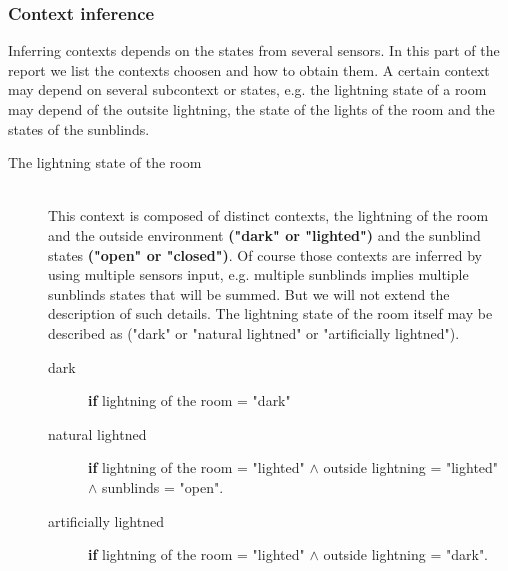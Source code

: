 \documentclass{acm_proc_article-sp}
\begin{document}
\subsubsection{Context inference}
Inferring contexts depends on the states from several sensors. In this part of the report we list the contexts choosen and how to obtain them.
A certain context may depend on several subcontext or states, 
e.g. the lightning state of a room may depend of the outsite lightning, the state of the lights of the room and the states of the sunblinds.
\begin{description}
 \item[The lightning state of the room]\hfill \\ 
 This context is composed of distinct contexts, the lightning of the room and the outside environment \textbf{("dark" or "lighted")} and the sunblind states \textbf{("open" or "closed")}. 
 Of course those contexts are inferred by using multiple sensors input, e.g. multiple sunblinds implies multiple sunblinds states that will be summed. But we will not extend the description of such details.
 The lightning state of the room itself may be described as ("dark" or "natural lightned" or "artificially lightned").
 \begin{description}
  \item[dark] \textbf{if} lightning of the room = "dark"
  \item[natural lightned] \textbf{if} lightning of the room = "lighted" $\land$ outside lightning = "lighted" $\land$ sunblinds = "open".
  \item[artificially lightned] \textbf{if} lightning of the room = "lighted" $\land$ outside lightning = "dark".
 \end{description}
 

\end{description}
\end{document}
